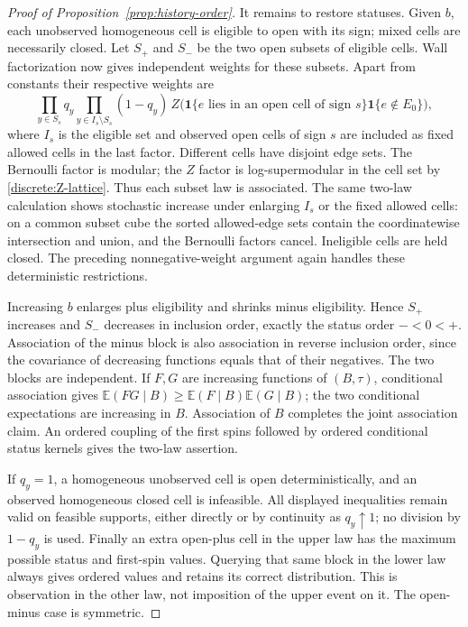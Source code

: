 \documentclass[11pt]{article}
\theoremstyle{definition}
\theoremstyle{remark}
\numberwithin{equation}{section}
\begin{document}
\begin{proof}[Proof of Proposition~\ref{prop:history-order}]
It remains to restore statuses. Given $b$, each unobserved homogeneous
cell is eligible to open with its sign; mixed cells are necessarily closed.
Let $S_+$ and $S_-$ be the two open subsets of eligible cells. Wall
factorization now gives independent weights for these subsets. Apart from
constants their respective weights are
\begin{equation}\label{discrete:subset-weight}
 \prod_{y\in S_s}q_y
 \prod_{y\in I_s\setminus S_s}(1-q_y)\,
 Z\bigl(\mathbf 1\{e\text{ lies in an open cell of sign }s\}
                    \mathbf 1\{e\notin E_0\}\bigr),
\end{equation}
where $I_s$ is the eligible set and observed open cells of sign $s$ are
included as fixed allowed cells in the last factor. Different cells have
disjoint edge sets. The Bernoulli factor is modular; the $Z$ factor is
log-supermodular in the cell set by \eqref{discrete:Z-lattice}. Thus each
subset law is associated. The same two-law calculation shows stochastic
increase under enlarging $I_s$ or the fixed allowed cells: on a common
subset cube the sorted allowed-edge sets contain the coordinatewise
intersection and union, and the Bernoulli factors cancel. Ineligible cells
are held closed. The preceding nonnegative-weight argument again handles
these deterministic restrictions.

Increasing $b$ enlarges plus eligibility and shrinks minus eligibility.
Hence $S_+$ increases and $S_-$ decreases in inclusion order, exactly the
status order $-<0<+$. Association of the minus block is also association
in reverse inclusion order, since the covariance of decreasing functions
equals that of their negatives. The two blocks are independent. If $F,G$
are increasing functions of $(B,\tau)$, conditional association gives
$\mathbb E(FG\mid B)\ge\mathbb E(F\mid B)\mathbb E(G\mid B)$; the two conditional
expectations are increasing in $B$. Association of $B$ completes the
joint association claim. An ordered coupling of the first spins followed
by ordered conditional status kernels gives the two-law assertion.

If $q_y=1$, a homogeneous unobserved cell is open deterministically, and
an observed homogeneous closed cell is infeasible. All displayed
inequalities remain valid on feasible supports, either directly or by
continuity as $q_y\uparrow1$; no division by $1-q_y$ is used. Finally an
extra open-plus cell in the upper law has the maximum possible status and
first-spin values. Querying that same block in the lower law always gives
ordered values and retains its correct distribution. This is observation
in the other law, not imposition of the upper event on it. The open-minus
case is symmetric.
\end{proof}
\end{document}
